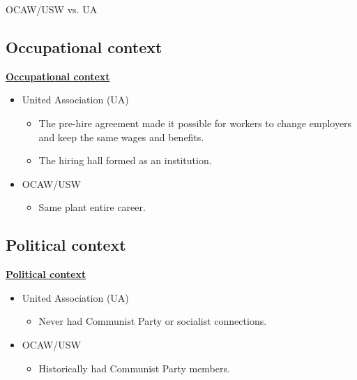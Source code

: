 \documentclass{beamer}
\begin{document}
\begin{frame}{OCAW/USW vs. UA}
\subsection{Occupational context}
\underline{\textbf{Occupational context}}
	\begin{itemize}
		\item United Association (UA)
		\begin{itemize}
			\item The pre-hire agreement made it possible for workers to change employers and keep the same wages and benefits. %
			\item The hiring hall formed as an institution.
		\end{itemize}
		\item OCAW/USW
			\begin{itemize}
				\item Same plant entire career.
			\end{itemize}
	\end{itemize}
\subsection{Political context}
\underline{\textbf{Political context}}
	\begin{itemize}
		\item United Association (UA)
		\begin{itemize}
			\item Never had Communist Party or socialist connections.
		\end{itemize}
		\item OCAW/USW
			\begin{itemize}
				\item Historically had Communist Party members.
			\end{itemize}
	\end{itemize}
\end{frame}
\end{document}
